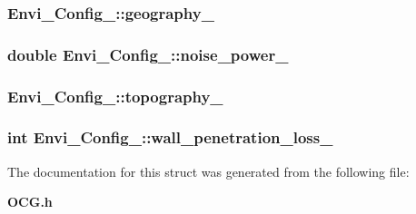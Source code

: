 \subsubsection[{geography\_\-}]{ {\bf Envi\_\-Config\_\-::geography\_\-}}\label{structEnvi__Config___3de72b26c5cc11ff8f174494507e9dc1}


\subsubsection[{noise\_\-power\_\-}]{\setlength{\rightskip}{0pt plus 5cm}double {\bf Envi\_\-Config\_\-::noise\_\-power\_\-}}\label{structEnvi__Config___d1541eee98eec3df4e7a7634b770461c}


\subsubsection[{topography\_\-}]{ {\bf Envi\_\-Config\_\-::topography\_\-}}\label{structEnvi__Config___9a84dc05d7d6f316e0c68af0f4215b9b}


\subsubsection[{wall\_\-penetration\_\-loss\_\-}]{\setlength{\rightskip}{0pt plus 5cm}int {\bf Envi\_\-Config\_\-::wall\_\-penetration\_\-loss\_\-}}\label{structEnvi__Config___656f3abe9f5452004dd8b0b709bf353e}




The documentation for this struct was generated from the following file:\begin{CompactItemize}
\item 
{\bf OCG.h}\end{CompactItemize}
